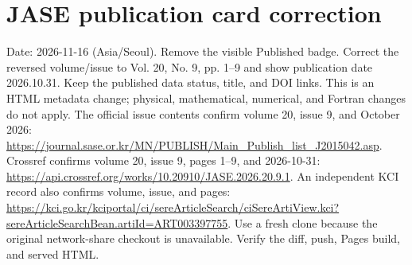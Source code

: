 \documentclass{article}
\begin{document}
\section*{JASE publication card correction}
Date: 2026-11-16 (Asia/Seoul).
Remove the visible Published badge. Correct the reversed volume/issue
to Vol. 20, No. 9, pp. 1--9 and show publication date 2026.10.31.
Keep the published data status, title, and DOI links.
This is an HTML metadata change; physical, mathematical, numerical,
and Fortran changes do not apply.
The official issue contents confirm volume 20, issue 9, and October 2026:
\url{https://journal.sase.or.kr/MN/PUBLISH/Main_Publish_list_J2015042.asp}.
Crossref confirms volume 20, issue 9, pages 1--9, and 2026-10-31:
\url{https://api.crossref.org/works/10.20910/JASE.2026.20.9.1}.
An independent KCI record also confirms volume, issue, and pages:
\url{https://kci.go.kr/kciportal/ci/sereArticleSearch/ciSereArtiView.kci?sereArticleSearchBean.artiId=ART003397755}.
Use a fresh clone because the original network-share checkout is
unavailable. Verify the diff, push, Pages build, and served HTML.
\end{document}
